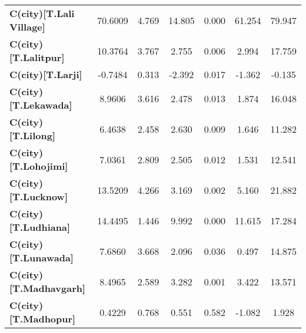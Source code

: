 \begin{center}
\begin{tabular}{lcccccc}
\textbf{C(city)[T.Lali Village]}                                                                    &      70.6009  &        4.769     &    14.805  &         0.000        &       61.254    &       79.947     \\
\textbf{C(city)[T.Lalitpur]}                                                                        &      10.3764  &        3.767     &     2.755  &         0.006        &        2.994    &       17.759     \\
\textbf{C(city)[T.Larji]}                                                                           &      -0.7484  &        0.313     &    -2.392  &         0.017        &       -1.362    &       -0.135     \\
\textbf{C(city)[T.Lekawada]}                                                                        &       8.9606  &        3.616     &     2.478  &         0.013        &        1.874    &       16.048     \\
\textbf{C(city)[T.Lilong]}                                                                          &       6.4638  &        2.458     &     2.630  &         0.009        &        1.646    &       11.282     \\
\textbf{C(city)[T.Lohojimi]}                                                                        &       7.0361  &        2.809     &     2.505  &         0.012        &        1.531    &       12.541     \\
\textbf{C(city)[T.Lucknow]}                                                                         &      13.5209  &        4.266     &     3.169  &         0.002        &        5.160    &       21.882     \\
\textbf{C(city)[T.Ludhiana]}                                                                        &      14.4495  &        1.446     &     9.992  &         0.000        &       11.615    &       17.284     \\
\textbf{C(city)[T.Lunawada]}                                                                        &       7.6860  &        3.668     &     2.096  &         0.036        &        0.497    &       14.875     \\
\textbf{C(city)[T.Madhavgarh]}                                                                      &       8.4965  &        2.589     &     3.282  &         0.001        &        3.422    &       13.571     \\
\textbf{C(city)[T.Madhopur]}                                                                        &       0.4229  &        0.768     &     0.551  &         0.582        &       -1.082    &        1.928     \\

\end{tabular}
\end{center}

